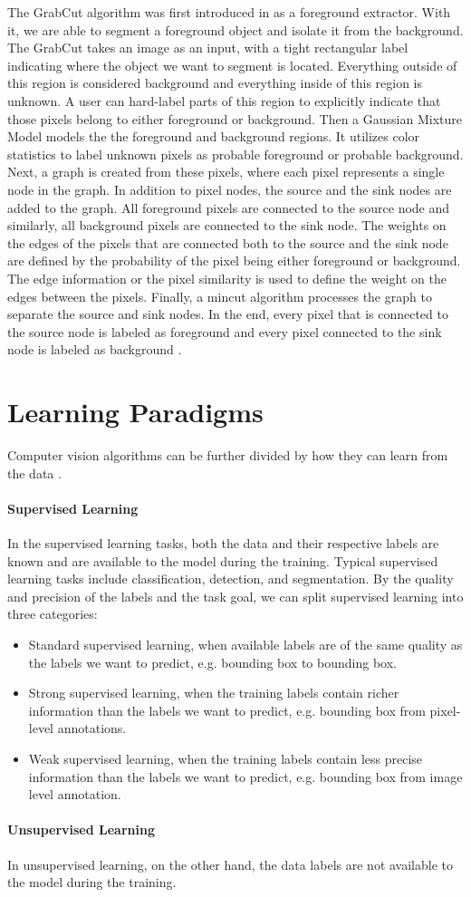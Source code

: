 The GrabCut algorithm was first introduced in \cite{Rother2004} as a foreground extractor. With it, we are able to segment a foreground object and isolate it from the background. The GrabCut takes an image as an input, with a tight rectangular label indicating where the object we want to segment is located. Everything outside of this region is considered background and everything inside of this region is unknown. A user can hard-label parts of this region to explicitly indicate that those pixels belong to either foreground or background. Then a Gaussian Mixture Model models the the foreground and background regions. It utilizes color statistics to label unknown pixels as probable foreground or probable background. Next, a graph is created from these pixels, where each pixel represents a single node in the graph. In addition to pixel nodes, the source and the sink nodes are added to the graph. All foreground pixels are connected to the source node and similarly, all background pixels are connected to the sink node. The weights on the edges of the pixels that are connected both to the source and the sink node are defined by the probability of the pixel being either foreground or background. The edge information or the pixel similarity is used to define the weight on the edges between the pixels. Finally, a mincut algorithm processes the graph to separate the source and sink nodes. In the end, every pixel that is connected to the source node is labeled as foreground and every pixel connected to the sink node is labeled as background \cite{opencv_grabcut}.


\section{Learning Paradigms}
Computer vision algorithms can be further divided by how they can learn from the data \cite{Alam2021}.

\paragraph{Supervised Learning} In the supervised learning tasks, both the data and their respective labels are known and are available to the model during the training. Typical supervised learning tasks include classification, detection, and segmentation. By the quality and precision of the labels and the task goal, we can split supervised learning into three categories:

\begin{itemize}
    \item Standard supervised learning, when available labels are of the same quality as the labels we want to predict, e.g. bounding box to bounding box.
    \item Strong supervised learning, when the training labels contain richer information than the labels we want to predict, e.g. bounding box from pixel-level annotations.
    \item Weak supervised learning, when the training labels contain less precise information than the labels we want to predict, e.g. bounding box from image level annotation.
\end{itemize}

\paragraph{Unsupervised Learning} In unsupervised learning, on the other hand, the data labels are not available to the model during the training.
